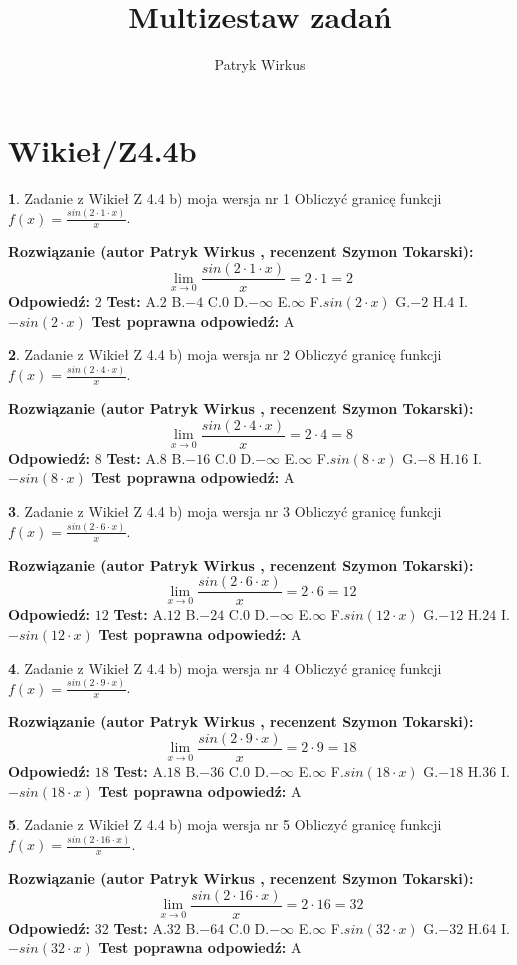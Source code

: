 \documentclass[12pt, a4paper]{article}
\title{Multizestaw zadań}
\author{Patryk Wirkus}
\date{}
\theoremstyle{definition} %
\newtheorem{zad}{}
\newcommand{\kategoria}[1]{\section{#1}}
\newcommand{\zadStart}[1]{\begin{zad}#1\newline}
\newcommand{\zadStop}{\end{zad}}
\newcommand{\rozwStart}[2]{\noindent \textbf{Rozwiązanie (autor #1 , recenzent #2): }\newline}
\newcommand{\rozwStop}{\newline}
\newcommand{\odpStart}{\noindent \textbf{Odpowiedź:}\newline}
\newcommand{\odpStop}{\newline}
\newcommand{\testStart}{\noindent \textbf{Test:}\newline}
\newcommand{\testStop}{\newline}
\newcommand{\kluczStart}{\noindent \textbf{Test poprawna odpowiedź:}\newline}
\newcommand{\kluczStop}{\newline}
\begin{document}
\maketitle

\kategoria{Wikieł/Z4.4b}


\zadStart{Zadanie z Wikieł Z 4.4 b) moja wersja nr 1}
Obliczyć granicę funkcji $f(x)=\frac{sin(2 \cdot1\cdot x)}{x}$.
\zadStop
\rozwStart{Patryk Wirkus}{Szymon Tokarski}
$$\lim\limits_{x\to 0}\frac{sin(2 \cdot 1\cdot x)}{x}=
2 \cdot 1 = 2$$
\rozwStop
\odpStart
$2$
\odpStop
\testStart
A.$2$
B.$-4$
C.$0$
D.$-\infty$
E.$\infty$
F.$sin(2\cdot x)$
G.$-2$
H.$4$
I.$-sin(2\cdot x)$
\testStop
\kluczStart
A
\kluczStop



\zadStart{Zadanie z Wikieł Z 4.4 b) moja wersja nr 2}
Obliczyć granicę funkcji $f(x)=\frac{sin(2 \cdot4\cdot x)}{x}$.
\zadStop
\rozwStart{Patryk Wirkus}{Szymon Tokarski}
$$\lim\limits_{x\to 0}\frac{sin(2 \cdot 4\cdot x)}{x}=
2 \cdot 4 = 8$$
\rozwStop
\odpStart
$8$
\odpStop
\testStart
A.$8$
B.$-16$
C.$0$
D.$-\infty$
E.$\infty$
F.$sin(8\cdot x)$
G.$-8$
H.$16$
I.$-sin(8\cdot x)$
\testStop
\kluczStart
A
\kluczStop



\zadStart{Zadanie z Wikieł Z 4.4 b) moja wersja nr 3}
Obliczyć granicę funkcji $f(x)=\frac{sin(2 \cdot6\cdot x)}{x}$.
\zadStop
\rozwStart{Patryk Wirkus}{Szymon Tokarski}
$$\lim\limits_{x\to 0}\frac{sin(2 \cdot 6\cdot x)}{x}=
2 \cdot 6 = 12$$
\rozwStop
\odpStart
$12$
\odpStop
\testStart
A.$12$
B.$-24$
C.$0$
D.$-\infty$
E.$\infty$
F.$sin(12\cdot x)$
G.$-12$
H.$24$
I.$-sin(12\cdot x)$
\testStop
\kluczStart
A
\kluczStop



\zadStart{Zadanie z Wikieł Z 4.4 b) moja wersja nr 4}
Obliczyć granicę funkcji $f(x)=\frac{sin(2 \cdot9\cdot x)}{x}$.
\zadStop
\rozwStart{Patryk Wirkus}{Szymon Tokarski}
$$\lim\limits_{x\to 0}\frac{sin(2 \cdot 9\cdot x)}{x}=
2 \cdot 9 = 18$$
\rozwStop
\odpStart
$18$
\odpStop
\testStart
A.$18$
B.$-36$
C.$0$
D.$-\infty$
E.$\infty$
F.$sin(18\cdot x)$
G.$-18$
H.$36$
I.$-sin(18\cdot x)$
\testStop
\kluczStart
A
\kluczStop



\zadStart{Zadanie z Wikieł Z 4.4 b) moja wersja nr 5}
Obliczyć granicę funkcji $f(x)=\frac{sin(2 \cdot16\cdot x)}{x}$.
\zadStop
\rozwStart{Patryk Wirkus}{Szymon Tokarski}
$$\lim\limits_{x\to 0}\frac{sin(2 \cdot 16\cdot x)}{x}=
2 \cdot 16 = 32$$
\rozwStop
\odpStart
$32$
\odpStop
\testStart
A.$32$
B.$-64$
C.$0$
D.$-\infty$
E.$\infty$
F.$sin(32\cdot x)$
G.$-32$
H.$64$
I.$-sin(32\cdot x)$
\testStop
\kluczStart
A
\kluczStop
\end{document}
